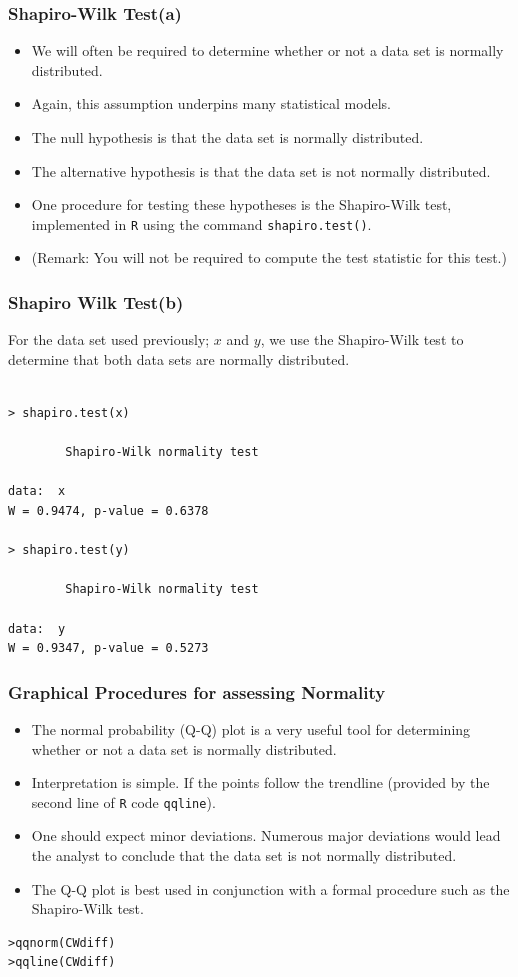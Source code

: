 \documentclass[a4]{beamer}
\begin{document}
\begin{frame}
\frametitle{Shapiro-Wilk Test(a)}


\begin{itemize}
\item We will often be required to determine whether or not a data set is normally distributed.
\item Again, this assumption underpins many statistical models.
\item The null hypothesis is that the data set is normally distributed.
\item The alternative hypothesis is that the data set is not normally distributed.
\item One procedure for testing these hypotheses is the Shapiro-Wilk test, implemented in \texttt{R} using the command \texttt{shapiro.test()}.
\item (Remark: You will not be required to compute the test statistic for this test.)
\end{itemize}
\end{frame}
\begin{frame}[fragile]
\frametitle{Shapiro Wilk Test(b)}
For the data set used previously; $x$ and $y$, we use the Shapiro-Wilk test to determine that both data sets are normally distributed.
\begin{verbatim}

> shapiro.test(x)

        Shapiro-Wilk normality test

data:  x
W = 0.9474, p-value = 0.6378

> shapiro.test(y)

        Shapiro-Wilk normality test

data:  y
W = 0.9347, p-value = 0.5273
\end{verbatim}

\end{frame}


\begin{frame}[fragile]
\frametitle{Graphical Procedures for assessing Normality}

\begin{itemize}
\item The normal probability (Q-Q) plot is a very useful tool for determining whether or not a data set is normally distributed.
\item Interpretation is simple. If the points follow the trendline (provided by the second line of \texttt{R} code \texttt{qqline}).
\item One should expect minor deviations. Numerous major deviations would lead the analyst to conclude that the data set is not normally distributed.
\item The Q-Q plot is best used in conjunction with a formal procedure such as the Shapiro-Wilk test.
\end{itemize}

\begin{verbatim}
>qqnorm(CWdiff)
>qqline(CWdiff)
\end{verbatim}

\end{frame}
\end{document}
